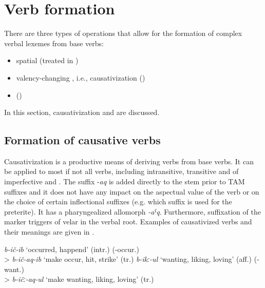 \chapter{Verb formation}
\label{cpt:verbformation}

There are three types of operations that allow for the formation of complex verbal lexemes from base verbs:
%
\begin{itemize}
	\item	spatial  (treated in )
	\item	valency-changing , i.e., causativization ()
	\item	{} ()
\end{itemize}

In this section, causativization and  are discussed. 



\section{Formation of causative verbs}
\label{sec:Formation of causative verbs}
Causativization is a productive means of deriving  verbs from base verbs. It can be applied to most if not all verbs, including intransitive, transitive and  of imperfective and . The  suffix -\textit{aq} is added directly to the stem prior to TAM suffixes and it does not have any impact on the aspectual value of the verb or on the choice of certain inflectional suffixes (e.g. which suffix is used for the preterite). It has a pharyngealized allomorph \textit{-aˁq}. Furthermore, suffixation of the  marker triggers  of velar  in the verbal root. Examples of causativized verbs and their meanings are given in .

\begin{exe}
	\ex	\label{ex:causativizedVerbForms}
	\begin{xlist}
	\ex \textit{b-ič-ib} ‘occurred, happend' (intr.) (-occur.) \\
	> \textit{b-ič-aq-ib} ‘make occur, hit, strike' (tr.)
	\ex \textit{b-ikː-ul} ‘wanting, liking, loving' (aff.) (-want.) \\
	> \textit{b-ičː-aq-ul} ‘make wanting, liking, loving' (tr.)
		\end{xlist}
\end{exe}

